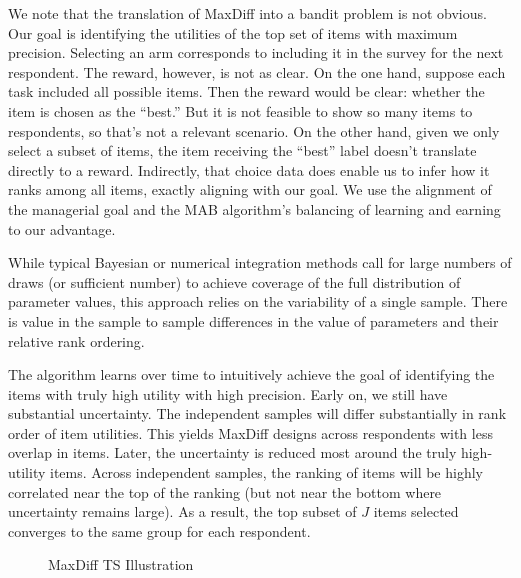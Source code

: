 \documentclass[a4paper,12pt]{article}
\begin{document}
We note that the translation of MaxDiff into a bandit problem is not obvious. Our goal is identifying the utilities of the top set of items with maximum precision. Selecting an arm corresponds to including it in the survey for the next respondent. The reward, however, is not as clear. On the one hand, suppose each task included all possible items. Then the reward would be clear: whether the item is chosen as the ``best.'' But it is not feasible to show so many items to respondents, so that's not a relevant scenario. On the other hand, given we only select a subset of items, the item receiving the ``best'' label doesn't translate directly to a reward. Indirectly, that choice data does enable us to infer how it ranks among all items, exactly aligning with our goal. We use the alignment of the managerial goal and the MAB algorithm's balancing of learning and earning to our advantage.


While typical Bayesian or numerical integration methods call for large numbers of draws (or sufficient number) to achieve coverage of the full distribution of parameter values, this approach relies on the variability of a single sample. There is value in the sample to sample differences in the value of parameters and their relative rank ordering.  

The algorithm learns over time to intuitively achieve the goal of identifying the items with truly high utility with high precision. Early on, we still have substantial uncertainty. The independent samples will differ substantially in rank order of item utilities. This yields MaxDiff designs across respondents with less overlap in items. Later, the uncertainty is reduced most around the truly high-utility items. Across independent samples, the ranking of items will be highly correlated near the top of the ranking (but not near the bottom where uncertainty remains large). As a result, the top subset of $J$ items selected converges to the same group for each respondent. 

\begin{figure}
\caption{MaxDiff TS Illustration}
\label{fig:illustrate_ts}
	\begin{center}
    \qquad
    \end{center}
\end{figure}
\end{document}
